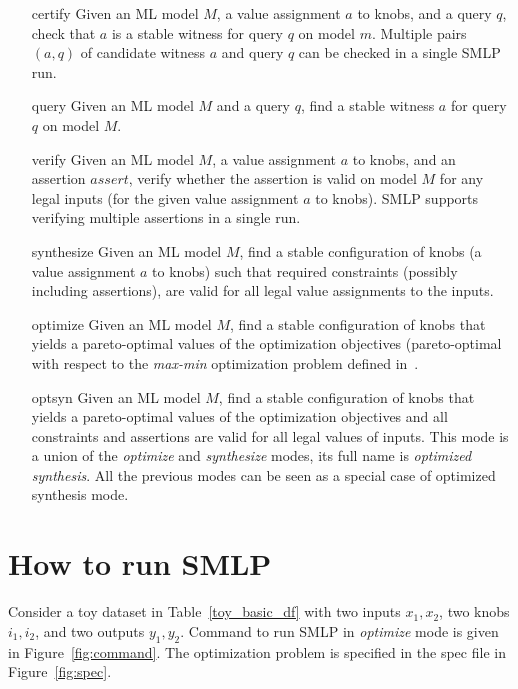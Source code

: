 \documentclass[a4paper,parskip=half]{article} %
\begin{document}
\begin{itemize}
\item[certify] Given an ML model $M$, a value assignment $a$ to knobs, and a query $q$, check that $a$ is a stable witness for query $q$ on model $m$. Multiple pairs $(a,q)$ of candidate witness $a$ and query $q$ can be checked in a single SMLP run.
\item[query] Given an ML model $M$  and a query $q$, find a stable witness $a$  for query $q$ on model $M$.
\item[verify] Given an ML model $M$,  a value assignment $a$ to knobs,  and an assertion $assert$, verify whether the assertion is valid on model $M$ for any legal inputs (for the given value assignment $a$ to knobs). SMLP supports verifying multiple assertions in a single run.
\item[synthesize] Given an ML model $M$,  find a stable configuration of knobs (a value assignment $a$ to knobs) such that required constraints (possibly including assertions),  are valid for all legal value assignments to the inputs.
\item[optimize]  Given an ML model $M$,  find a stable configuration of knobs that yields a pareto-optimal values of the optimization objectives (pareto-optimal with respect to the \emph{max-min} optimization problem defined in~\cite{BKK24}.
\item[optsyn] Given an ML model $M$,  find a stable configuration of knobs that yields a pareto-optimal values of the optimization objectives and all constraints and assertions are valid for all legal values of inputs. This mode is a union of the \emph{optimize} and \emph{synthesize} modes, its full name is \emph{optimized synthesis}. All the previous modes can be seen as a special case of optimized synthesis mode.
\end{itemize}


\section{How to run SMLP}\label{sec:run}


Consider a toy dataset in Table~\cref{toy_basic_df} with two inputs $x_1, x_2$, two knobs $i_1, i_2$, and two outputs $y_1, y_2$.
Command to run SMLP in \emph{optimize} mode is given in Figure~\cref{fig:command}.
The optimization problem is specified in the spec file in Figure~\cref{fig:spec}.
\end{document}
